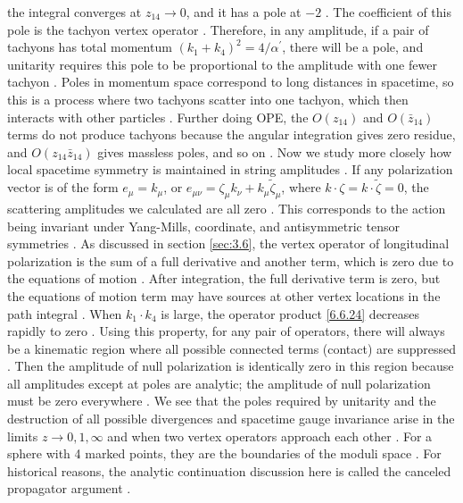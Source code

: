 the integral converges at $z_{14} \rightarrow 0$, and it has a pole at $-2$ . The coefficient of this pole is the tachyon vertex operator . Therefore, in any amplitude, if a pair of tachyons has total momentum $(k_{1}+k_{4})^{2}=4 / \alpha^{\prime}$, there will be a pole, and unitarity requires this pole to be proportional to the amplitude with one fewer tachyon . Poles in momentum space correspond to long distances in spacetime, so this is a process where two tachyons scatter into one tachyon, which then interacts with other particles . Further doing OPE, the $O(z_{14})$ and $O(\bar{z}_{14})$ terms do not produce tachyons because the angular integration gives zero residue, and $O(z_{14} \bar{z}_{14})$ gives massless poles, and so on . Now we study more closely how local spacetime symmetry is maintained in string amplitudes . If any polarization vector is of the form $e_{\mu}=k_{\mu}$, or $e_{\mu \nu}=\zeta_{\mu} k_{\nu}+k_{\mu} \tilde{\zeta}_{\mu}$, where $k \cdot \zeta=k \cdot \tilde{\zeta}=0$, the scattering amplitudes we calculated are all zero . This corresponds to the action being invariant under Yang-Mills, coordinate, and antisymmetric tensor symmetries . As discussed in section \ref{sec:3.6}, the vertex operator of longitudinal polarization is the sum of a full derivative and another term, which is zero due to the equations of motion . After integration, the full derivative term is zero, but the equations of motion term may have sources at other vertex locations in the path integral . When $k_{1} \cdot k_{4}$ is large, the operator product \eqref{6.6.24} decreases rapidly to zero . Using this property, for any pair of operators, there will always be a kinematic region where all possible connected terms (contact) are suppressed . Then the amplitude of null polarization is identically zero in this region because all amplitudes except at poles are analytic; the amplitude of null polarization must be zero everywhere . We see that the poles required by unitarity and the destruction of all possible divergences and spacetime gauge invariance arise in the limits $z \rightarrow 0,1, \infty$ and when two vertex operators approach each other . For a sphere with 4 marked points, they are the boundaries of the moduli space . For historical reasons, the analytic continuation discussion here is called the canceled propagator argument .

